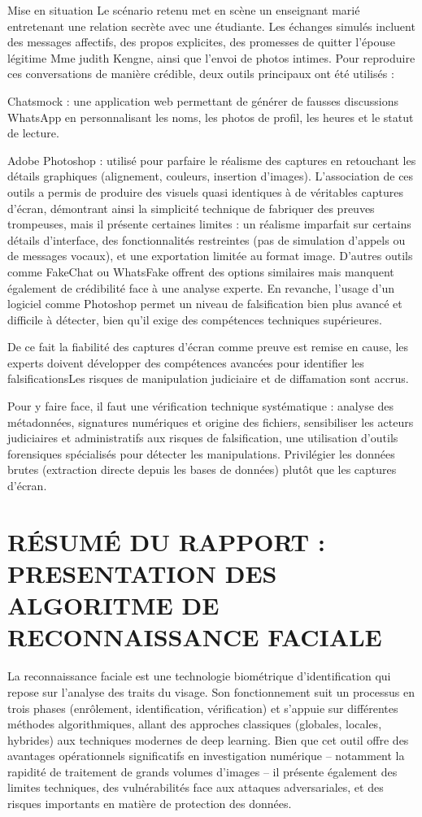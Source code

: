 \documentclass[12pt,a4paper]{article}
\begin{document}
{		Mise en situation 
		Le scénario retenu met en scène un enseignant marié entretenant une relation secrète avec une étudiante. Les échanges simulés incluent des messages affectifs, des propos explicites, des promesses de quitter l’épouse légitime Mme judith Kengne, ainsi que l’envoi de photos intimes. Pour reproduire ces conversations de manière crédible, deux outils principaux ont été utilisés :
		
		Chatsmock : une application web permettant de générer de fausses discussions WhatsApp en personnalisant les noms, les photos de profil, les heures et le statut de lecture.
		
		Adobe Photoshop : utilisé pour parfaire le réalisme des captures en retouchant les détails graphiques (alignement, couleurs, insertion d’images).
		L’association de ces outils a permis de produire des visuels quasi identiques à de véritables captures d’écran, démontrant ainsi la simplicité technique de fabriquer des preuves trompeuses, mais il présente certaines limites : un réalisme imparfait sur certains détails d’interface, des fonctionnalités restreintes (pas de simulation d’appels ou de messages vocaux), et une exportation limitée au format image. D’autres outils comme FakeChat ou WhatsFake offrent des options similaires mais manquent également de crédibilité face à une analyse experte. En revanche, l’usage d’un logiciel comme Photoshop permet un niveau de falsification bien plus avancé et difficile à détecter, bien qu’il exige des compétences techniques supérieures.
		
		De ce fait la fiabilité des captures d’écran comme preuve est remise en cause, les experts doivent développer des compétences avancées pour identifier les falsificationsLes risques de manipulation judiciaire et de diffamation sont accrus.
		
		Pour y faire face, il faut une vérification technique systématique : analyse des métadonnées, signatures numériques et origine des fichiers, sensibiliser les acteurs judiciaires et administratifs aux risques de falsification, une utilisation d’outils forensiques spécialisés pour détecter les manipulations. Privilégier les données brutes (extraction directe depuis les bases de données) plutôt que les captures d’écran.\\[1.5 cm]
		\section*{RÉSUMÉ DU RAPPORT : PRESENTATION DES ALGORITME DE RECONNAISSANCE FACIALE}
		La reconnaissance faciale est une technologie biométrique d'identification qui repose sur l'analyse des traits du visage. Son fonctionnement suit un processus en trois phases (enrôlement, identification, vérification) et s'appuie sur différentes méthodes algorithmiques, allant des approches classiques (globales, locales, hybrides) aux techniques modernes de deep learning. Bien que cet outil offre des avantages opérationnels significatifs en investigation numérique – notamment la rapidité de traitement de grands volumes d'images – il présente également des limites techniques, des vulnérabilités face aux attaques adversariales, et des risques importants en matière de protection des données.
		
}
\end{document}
